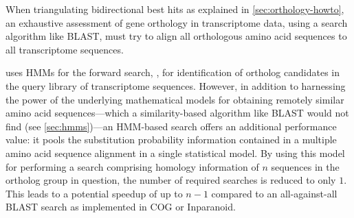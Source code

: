 \label{sec:hmm-forward-search}
When triangulating bidirectional best hits as explained in
\autoref{sec:orthology-howto}, an exhaustive assessment of gene orthology in
transcriptome data, using a search algorithm like BLAST, must try to align all
orthologous amino acid sequences to all transcriptome sequences.  

\pname uses HMMs for the forward search, \ie, for identification of ortholog
candidates in the query library of transcriptome sequences. However, in addition
to harnessing the power of the underlying mathematical models for obtaining
remotely similar amino acid sequences---which a similarity-based algorithm like
BLAST would not find (see \autoref{sec:hmms})---an HMM-based search offers an
additional performance value: it pools the substitution probability information
contained in a multiple amino acid sequence alignment in a single statistical
model. By using this model for performing a search comprising homology
information of $n$ sequences in the ortholog group in question, the number of
required searches is reduced to only $1$. This leads to a potential speedup of
up to $n-1$ compared to an all-against-all BLAST search as implemented in COG
or Inparanoid.


